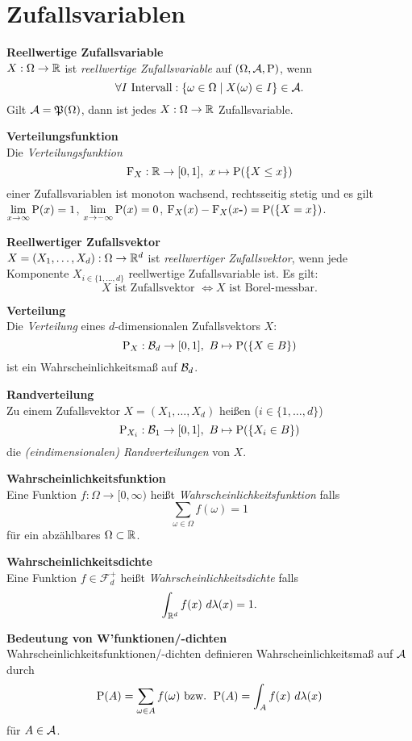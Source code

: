 \section{Zufallsvariablen}
\textbf{Reellwertige Zufallsvariable}\\
$X:\Omega\to\R$ ist \textit{reellwertige Zufallsvariable} auf $(\Omega,\A,\P)$, wenn
\[
	\forall I \text{ Intervall}: \{\omega\in\Omega\mid X(\omega)\in I\}\in\A.
\]
Gilt $\A=\mathfrak{P}(\Omega)$, dann ist jedes $X:\Omega\to\R$ Zufallsvariable.

\textbf{Verteilungsfunktion}\\
Die \textit{Verteilungsfunktion}
\[
	\F_X:\R\to[0,1],\ x\mapsto\P(\{X\leq x\})
\]
einer Zufallsvariablen ist monoton wachsend, rechtsseitig stetig und es gilt\\
$\lim\limits_{x\to\infty}\P(x)=1$,
$\lim\limits_{x\to -\infty}\P(x)=0$, 
\mbox{$\F_X(x)-\F_X(x\textbf{-})=\P(\{X=x\})$}.

\textbf{Reellwertiger Zufallsvektor}\\
$X=(X_1,\ldots,X_d):\Omega\to\R^d$ ist \textit{reellwertiger Zufallsvektor}, wenn jede
Komponente $X_{i\in\{1,\ldots,d\}}$ reellwertige Zufallsvariable ist. Es gilt:\\
\[
	X \text{ ist Zufallsvektor } \Leftrightarrow X \text{ ist Borel-messbar.}
\]

\textbf{Verteilung}\\
Die \textit{Verteilung} eines $d$-dimensionalen Zufallsvektors $X$: 
\[
	\P_X: \B{d}\to [0,1],\ B\mapsto\P(\{X\in B\})
\]
ist ein Wahrscheinlichkeitsmaß auf $\B{d}$.

\textbf{Randverteilung}\\
Zu einem Zufallsvektor $X=(X_1,\ldots,X_d)$ heißen ($i\in\{1,\ldots,d\}$)
\[
	\P_{X_i} :\B{1}\to[0,1],\ B\mapsto \P(\{X_i\in B\})
\]
die \textit{(eindimensionalen) Randverteilungen} von $X$.

\textbf{Wahrscheinlichkeitsfunktion}\\
Eine Funktion $f:\Omega\to[0,\infty)$ heißt \textit{Wahrscheinlichkeitsfunktion} falls
\[
	  \sum_{\omega\in\Omega} f(\omega)=1
\]
für ein abzählbares $\Omega\subset\R$.

\textbf{Wahrscheinlichkeitsdichte}\\
Eine Funktion $f\in\mathcal{F}_d^+$ heißt \textit{Wahrscheinlichkeitsdichte} falls
\[
	 \int_{\R^d} f(x)~d\lambda(x)=1.
\]

\textbf{Bedeutung von W'funktionen/-dichten}\\
Wahrscheinlichkeitsfunktionen/-dichten definieren Wahrscheinlichkeitsmaß auf $\A$
durch 
\[
\P(A)=\sum_{\omega\in A}f(\omega) \text{ bzw. } \P(A)=\int_A f(x)~d\lambda(x)
\]
für $A\in\A$.


